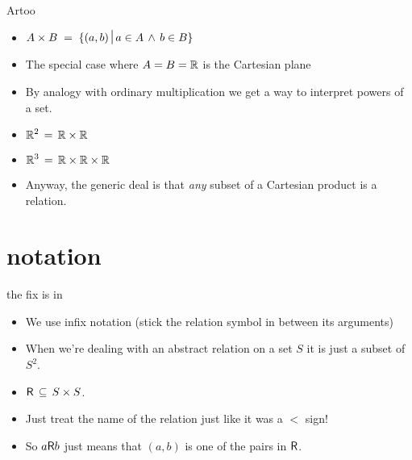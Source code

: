 \documentclass[handout,landscape]{beamer}
\begin{document}
\begin{frame}{Artoo}
\begin{itemize}
\item $\displaystyle A \times B \; = \; \{ (a,b) \suchthat a \in A \, \land \, b \in B \} $ \pause
\item The special case where $A = B = {\mathbb R}$ is the Cartesian plane
\item By analogy with ordinary multiplication we get a way to interpret powers of a set. \pause
\item $\displaystyle {\mathbb R}^2 \, = \, {\mathbb R} \times {\mathbb R}$ \pause
\item $\displaystyle {\mathbb R}^3 \, = \, {\mathbb R} \times {\mathbb R} \times {\mathbb R}$ \pause
\item Anyway, the generic deal is that {\em any} subset of a Cartesian product is a relation.
\end{itemize}
\end{frame}

\section{notation}

\begin{frame}{the fix is in}
\begin{itemize}
\item We use infix notation (stick the relation symbol in between its arguments) \pause
\item When we're dealing with an abstract relation on a set $S$ it is just a subset of $S^2$. \pause
\item $\displaystyle  \mbox{\textsf R} \, \subseteq \, S \times S$. \pause
\item Just treat the name of the relation just like it was a $<$ sign! \pause
\item So $a \mbox{\textsf R} b$ just means that $(a,b)$ is one of the pairs in $\mbox{\textsf R}$.
\end{itemize}
\end{frame}
\end{document}
